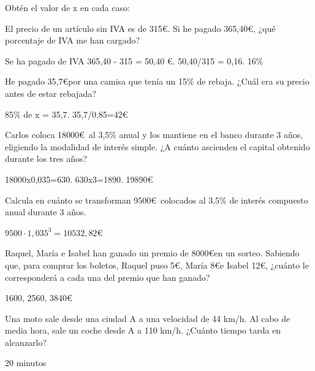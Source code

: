 \documentclass[addpoints,spanish, 12pt,a4paper]{exam}
\begin{document}
\begin{questions}

\question Obtén el valor de x en cada caso:
\addpoints


\question [2] El precio de un artículo sin IVA es de 315\euro. Si he pagado 365,40\euro, ¿qué porcentaje de IVA me han cargado?
\begin{solution}
Se ha pagado de IVA 365,40 - 315 = 50,40 \euro. 50,40/315 = 0,16. 16\%
\end{solution}

\question [2] He pagado 35,7\euro por una camisa que tenía un 15\% de rebaja. ¿Cuál era su precio antes de estar rebajada?
\begin{solution}
85\% de x = 35,7. 35,7/0,85=42\euro
\end{solution}

\question [2] Carlos coloca 18000\euro \   al 3,5\% anual y los mantiene en el banco durante 3 años, eligiendo la modalidad de interés simple. ¿A cuánto ascienden el capital obtenido durante los tres años?
\begin{solution}
18000x0,035=630. 630x3=1890. 19890\euro
\end{solution}


\question [2] Calcula en cuánto se transforman 9500\euro \ colocados al 3,5\% de interés compuesto anual durante 3 años.
\begin{solution}
$9500\cdot1,035^3=10532,82$\euro
\end{solution}

\question [2] Raquel, María e Isabel han ganado un premio de 8000\euro en un sorteo. Sabiendo que, para comprar los boletos, Raquel puso 5\euro, María 8\euro e Isabel 12\euro, ¿cuánto le corresponderá a cada una del premio que han ganado?
\begin{solution}
1600, 2560, 3840\euro
\end{solution}



\question [2] Una moto sale desde una ciudad A a una velocidad de 44 km/h. Al cabo de media hora, sale un coche desde A a 110 km/h. ¿Cuánto tiempo tarda en alcanzarlo?
\begin{solution}
20 minutos
\end{solution}


\addpoints

\end{questions}
\end{document}

